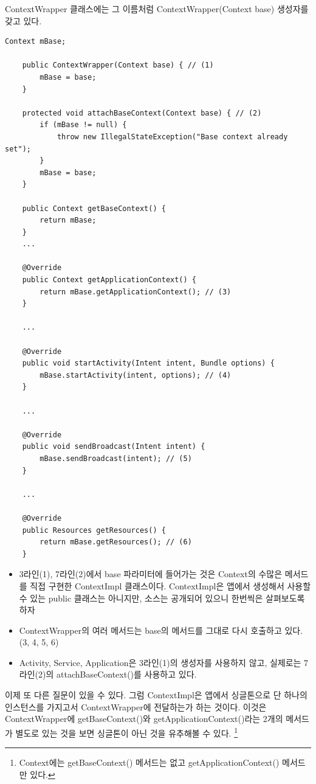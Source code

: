 ContextWrapper 클래스에는 그 이름처럼 ContextWrapper(Context base) 생성자를 갖고 있다.
\begin{lstlisting}[frame=single, caption=ContextWrapper.java]
    Context mBase;

    public ContextWrapper(Context base) { // (1)
        mBase = base;
    }

	protected void attachBaseContext(Context base) { // (2)
        if (mBase != null) {
            throw new IllegalStateException("Base context already set");
        }
        mBase = base;
    }
    
    public Context getBaseContext() {
        return mBase;
    }
    ...
    
    @Override
    public Context getApplicationContext() {
        return mBase.getApplicationContext(); // (3)
    }
    
    ...
    
    @Override
    public void startActivity(Intent intent, Bundle options) {
        mBase.startActivity(intent, options); // (4)
    }
    
    ...
    
    @Override
    public void sendBroadcast(Intent intent) {
        mBase.sendBroadcast(intent); // (5)
    }

	... 
	
    @Override
    public Resources getResources() {
        return mBase.getResources(); // (6)
    }
\end{lstlisting}
\begin{itemize}
\item 3라인(1), 7라인(2)에서 base 파라미터에 들어가는 것은 Context의 수많은 메서드를 직접 구현한 ContextImpl 클래스이다. ContextImpl은 앱에서 생성해서 사용할 수 있는 public 클래스는 아니지만, 소스는 공개되어 있으니 한번씩은 살펴보도록 하자
\item ContextWrapper의 여러 메서드는 base의 메서드를 그대로 다시 호출하고 있다.(3, 4, 5, 6)
\item Activity, Service, Application은 3라인(1)의 생성자를 사용하지 않고, 실제로는 7라인(2)의 attachBaseContext()를 사용하고 있다.
\end{itemize}

이제 또 다른 질문이 있을 수 있다. 그럼 ContextImpl은 앱에서 싱글톤으로 단 하나의 인스턴스를 가지고서 ContextWrapper에 전달하는가 하는 것이다.
이것은 ContextWrapper에 getBaseContext()와 getApplicationContext()라는 2개의 메서드가 별도로 있는 것을 보면 싱글톤이 아닌 것을 유추해볼 수 있다. \footnote{Context에는 getBaseContext() 메서드는 없고 getApplicationContext() 메서드만 있다.}\\

